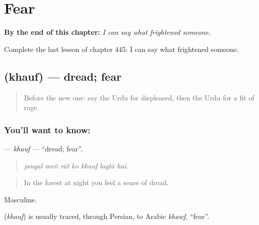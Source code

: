 
\chapter{Fear}
\label{ch:ur-fear}

\begin{chapteropening}
\textbf{By the end of this chapter:} \emph{I can say what frightened someone.}

Complete the last lesson of chapter 445: I can say what frightened someone.
\end{chapteropening}

\section[\texorpdfstring{\ur{خوف} (khauf)}{خوف (khauf)}]{ (khauf) — dread; fear}

\label{lesson:UR-C445-khauf}



\begin{quote}
Before the new one: say the Urdu for displeased, then the Urdu for a fit of rage.
\end{quote}

\subsection*{You'll want to know: }
\textbf{} — \emph{khauf} — \textquotedblleft{}dread; fear\textquotedblright{}.

\begin{quote}
      
\end{quote}

\begin{quote}
\emph{jangal meṅ rāt ko khauf lagtā hai.}
\end{quote}

\begin{quote}
In the forest at night you feel a sense of dread.
\end{quote}

Masculine.

\begin{cousinweb}
\textbf{} (\emph{khauf}) is usually traced, through Persian, to Arabic \emph{khawf}, \textquotedblleft{}fear\textquotedblright{}.
\end{cousinweb}


